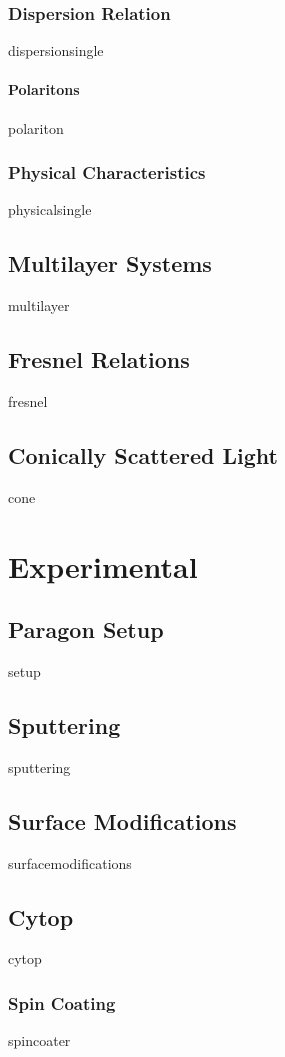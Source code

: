 \documentclass[a4paper,titlepage,onecolumn]{report}
\begin{document}
  \subsection{Dispersion Relation}
  {dispersionsingle}
		\subsubsection{Polaritons}
		{polariton}
  \subsection{Physical Characteristics}
  {physicalsingle}
 \section{Multilayer Systems}
 {multilayer}
 \section{Fresnel Relations}
 {fresnel}
 \section{Conically Scattered Light}\label{sec:coneexist}
 {cone}

\chapter{Experimental} \label{ch:experimental}
 \section{Paragon Setup}
 {setup}
 \section{Sputtering}
 {sputtering}
 \section{Surface Modifications}
  {surfacemodifications}
 \section{Cytop}
 {cytop}
  \subsection{Spin Coating}
  {spincoater}
\end{document}
